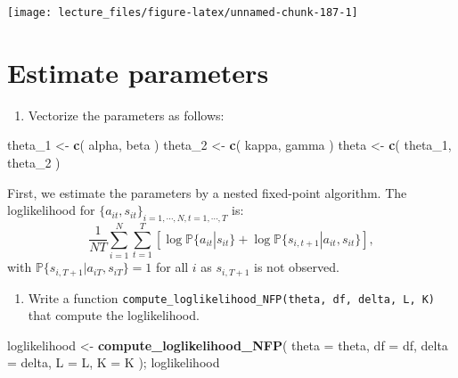 \documentclass[
]{book}
\newenvironment{Shaded}{\begin{snugshade}}{\end{snugshade}}
\newcommand{\AttributeTok}[1]{\textcolor[rgb]{0.13,0.29,0.53}{#1}}
\newcommand{\FunctionTok}[1]{\textcolor[rgb]{0.13,0.29,0.53}{\textbf{#1}}}
\newcommand{\NormalTok}[1]{#1}
\newcommand{\OtherTok}[1]{\textcolor[rgb]{0.56,0.35,0.01}{#1}}
\providecommand{\tightlist}{%
  \setlength{\itemsep}{0pt}\setlength{\parskip}{0pt}}
\begin{document}
\begin{center}\texttt{[image: lecture\_files/figure-latex/unnamed-chunk-187-1]} \end{center}

\hypertarget{estimate-parameters}{%
\section{Estimate parameters}\label{estimate-parameters}}

\begin{enumerate}
\def\labelenumi{\arabic{enumi}.}
\tightlist
\item
  Vectorize the parameters as follows:
\end{enumerate}

\begin{Shaded}
\begin{Highlighting}[]
\NormalTok{theta\_1 }\OtherTok{\textless{}{-}} 
  \FunctionTok{c}\NormalTok{(}
\NormalTok{    alpha, }
\NormalTok{    beta}
\NormalTok{    )}
\NormalTok{theta\_2 }\OtherTok{\textless{}{-}} 
  \FunctionTok{c}\NormalTok{(}
\NormalTok{    kappa, }
\NormalTok{    gamma}
\NormalTok{    )}
\NormalTok{theta }\OtherTok{\textless{}{-}} 
  \FunctionTok{c}\NormalTok{(}
\NormalTok{    theta\_1, }
\NormalTok{    theta\_2}
\NormalTok{    )}
\end{Highlighting}
\end{Shaded}

First, we estimate the parameters by a nested fixed-point algorithm. The loglikelihood for \(\{a_{it}, s_{it}\}_{i = 1, \cdots, N, t = 1, \cdots, T}\) is:
\[
\frac{1}{NT} \sum_{i = 1}^N \sum_{t = 1}^T[\log\mathbb{P}\{a_{it}|s_{it}\} + \log \mathbb{P}\{s_{i, t + 1}|a_{it}, s_{it}\}],
\]
with \(\mathbb{P}\{s_{i, T + 1}|a_{iT}, s_{iT}\} = 1\) for all \(i\) as \(s_{i, T + 1}\) is not observed.

\begin{enumerate}
\def\labelenumi{\arabic{enumi}.}
\setcounter{enumi}{1}
\tightlist
\item
  Write a function \texttt{compute\_loglikelihood\_NFP(theta,\ df,\ delta,\ L,\ K)} that compute the loglikelihood.
\end{enumerate}

\begin{Shaded}
\begin{Highlighting}[]
\NormalTok{loglikelihood }\OtherTok{\textless{}{-}} 
  \FunctionTok{compute\_loglikelihood\_NFP}\NormalTok{(}
    \AttributeTok{theta =}\NormalTok{ theta, }
    \AttributeTok{df =}\NormalTok{ df, }
    \AttributeTok{delta =}\NormalTok{ delta, }
    \AttributeTok{L =}\NormalTok{ L,}
    \AttributeTok{K =}\NormalTok{ K}
\NormalTok{    ); }
\NormalTok{loglikelihood}
\end{Highlighting}
\end{Shaded}
\end{document}
